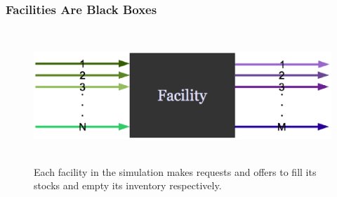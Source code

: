 \documentclass[9pt]{beamer}
\begin{document}
\begin{frame}[ctb!]
  \frametitle{Facilities Are Black Boxes}
  \begin{figure}[htbp!]
    \begin{center}
      \includegraphics[height=5cm]{facility.eps}
    \end{center}
    \caption{ Each facility in the simulation makes requests and offers 
    to fill its stocks and empty its inventory respectively.  }
    \label{fig:facility}
  \end{figure}
\end{frame}
\end{document}
